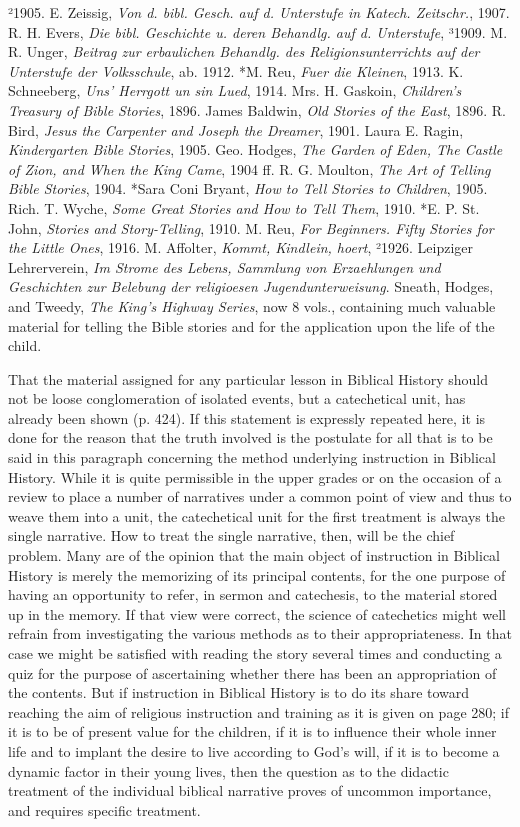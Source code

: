 ²1905. E. Zeissig, \emph{Von d. bibl. Gesch. auf d. Unterstufe in Katech. Zeitschr.}, 1907. R. H. Evers, \emph{Die bibl. Geschichte u. deren Behandlg. auf d. Unterstufe}, ³1909. M. R. Unger, \emph{Beitrag zur erbaulichen Behandlg. des Religionsunterrichts auf der Unterstufe der Volksschule}, ab. 1912. *M. Reu, \emph{Fuer die Kleinen}, 1913. K. Schneeberg, \emph{Uns’ Herrgott un sin Lued}, 1914. Mrs. H. Gaskoin, \emph{Children’s Treasury of Bible Stories}, 1896. James Baldwin, \emph{Old Stories of the East}, 1896. R. Bird, \emph{Jesus the Carpenter and Joseph the Dreamer}, 1901. Laura E. Ragin, \emph{Kindergarten Bible Stories}, 1905. Geo. Hodges, \emph{The Garden of Eden, The Castle of Zion, and When the King Came}, 1904 ff. R. G. Moulton, \emph{The Art of Telling Bible Stories}, 1904. *Sara Coni Bryant, \emph{How to Tell Stories to Children}, 1905. Rich. T. Wyche, \emph{Some Great Stories and How to Tell Them}, 1910. *E. P. St. John, \emph{Stories and Story-Telling}, 1910. M. Reu, \emph{For Beginners. Fifty Stories for the Little Ones}, 1916. M. Affolter, \emph{Kommt, Kindlein, hoert}, ²1926. Leipziger Lehrerverein, \emph{Im Strome des Lebens, Sammlung von Erzaehlungen und Geschichten zur Belebung der religioesen Jugendunterweisung}. Sneath, Hodges, and Tweedy, \emph{The King’s Highway Series}, now 8 vols., containing much valuable material for telling the Bible stories and for the application upon the life of the child.

That the material assigned for any particular lesson in Biblical History should not be loose conglomeration of isolated events, but a catechetical unit, has already been shown (p. 424). If this statement is expressly repeated here, it is done for the reason that the truth involved is the postulate for all that is to be said in this paragraph concerning the method underlying instruction in Biblical History. While it is quite permissible in the upper grades or on the occasion of a review to place a number of narratives under a common point of view and thus to weave them into a unit, the catechetical unit for the first treatment is always the single narrative. How to treat the single narrative, then, will be the chief problem. Many are of the opinion that the main object of instruction in Biblical History is merely the memorizing of its principal contents, for the one purpose of having an opportunity to refer, in sermon and catechesis, to the material stored up in the memory. If that view were correct,
the science of catechetics might well refrain from investigating the various methods as to their appropriateness. In that case we might be satisfied with reading the story several times and conducting a quiz for the purpose of ascertaining whether there has been an appropriation of the contents. But if instruction in Biblical History is to do its share toward reaching the aim of religious instruction and training as it is given on page 280; if it is to be of present value for the children, if it is to influence their whole inner life and to implant the desire to live according to God’s will, if it is to become a dynamic factor in their young lives, then the question as to the didactic treatment of the individual biblical narrative proves of uncommon importance, and requires specific treatment.

